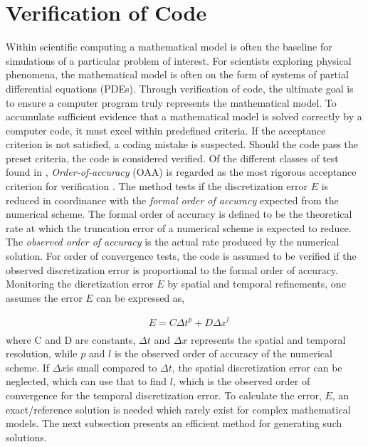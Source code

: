 \section{Verification of Code}
Within scientific computing a mathematical model is often the baseline for simulations of a particular problem of interest. For scientists exploring physical phenomena, the mathematical model is often on the form of systems of partial differential equations (PDEs). 
Through verification of code, the ultimate goal is to ensure a computer program truly represents the mathematical model. To accumulate sufficient evidence that a mathematical model is solved correctly by a computer code,  it must excel within predefined criteria. If the acceptance criterion is not satisfied, a coding mistake is suspected. Should the code pass the preset criteria, the code is considered verified. Of the different classes of test found in \cite{Roache},  \textit{Order-of-accuracy} (OAA)  is regarded as the most rigorous acceptance criterion for verification \cite{Biggs, Roache, Etienne2006}. The method tests if the discretization error $E$ is reduced in coordinance with the \textit{formal order of accuracy} expected from the numerical scheme. The formal order of accuracy is defined to be the theoretical rate at which the truncation error of a numerical scheme is expected to reduce. The \textit{observed order of accuracy} is the actual rate produced by the numerical solution. For order of convergence tests, the code is assumed to be verified if the observed discretization error is proportional to the formal order of accuracy.  Monitoring the dicretization error $E$ by spatial and temporal refinements, one assumes the error $E$ can be expressed as,

\begin{align*}
&E = C\Delta t^p + D\Delta x^l\\
\end{align*} 
where C and D are constants, $\Delta t$ and $\Delta x$ represents the spatial and temporal resolution, while $p$ and $l$ is the observed order of accuracy of the numerical scheme. If $\Delta x$is small compared to $\Delta t$, the spatial discretization error can be neglected, which can use that to find $l$, which is the observed order of convergence for the temporal discretization error. To calculate the error, $E$, an exact/reference solution is needed which rarely exist for complex mathematical models. The next subsection presents an efficient method for generating such solutions.

